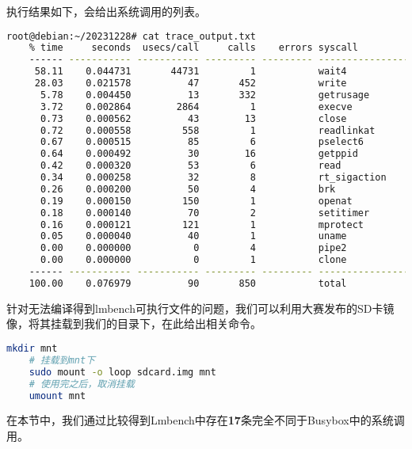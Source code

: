 执行结果如下，会给出系统调用的列表。
\begin{lstlisting}[language=bash]
	root@debian:~/20231228# cat trace_output.txt
	% time     seconds  usecs/call     calls    errors syscall
	------ ----------- ----------- --------- --------- ----------------
	 58.11    0.044731       44731         1           wait4
	 28.03    0.021578          47       452           write
	  5.78    0.004450          13       332           getrusage
	  3.72    0.002864        2864         1           execve
	  0.73    0.000562          43        13           close
	  0.72    0.000558         558         1           readlinkat
	  0.67    0.000515          85         6           pselect6
	  0.64    0.000492          30        16           getppid
	  0.42    0.000320          53         6           read
	  0.34    0.000258          32         8           rt_sigaction
	  0.26    0.000200          50         4           brk
	  0.19    0.000150         150         1           openat
	  0.18    0.000140          70         2           setitimer
	  0.16    0.000121         121         1           mprotect
	  0.05    0.000040          40         1           uname
	  0.00    0.000000           0         4           pipe2
	  0.00    0.000000           0         1           clone
	------ ----------- ----------- --------- --------- ----------------
	100.00    0.076979          90       850           total
\end{lstlisting}

针对无法编译得到lmbench可执行文件的问题，我们可以利用大赛发布的SD卡镜像，将其挂载到我们的目录下，在此给出相关命令。

\begin{lstlisting}[language=bash]
     	mkdir mnt
	# 挂载到mnt下
	sudo mount -o loop sdcard.img mnt
	# 使用完之后，取消挂载
	umount mnt
\end{lstlisting}


在本节中，我们通过比较得到Lmbench中存在\textbf{17}条完全不同于Busybox中的系统调用。

